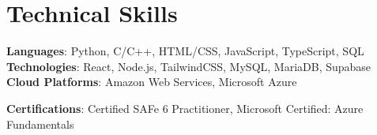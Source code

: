 \documentclass[letterpaper,11pt]{article}
\begin{document}
\section{Technical Skills}
 \begin{itemize}[leftmargin=0.15in, label={}]
    \small{\item{
     \textbf{Languages}{: Python, C/C++, HTML/CSS, JavaScript, TypeScript, SQL} \\
    \textbf{Technologies}{: React, Node.js, TailwindCSS, MySQL, MariaDB, Supabase} \\
     \textbf{Cloud Platforms}{: Amazon Web Services, Microsoft Azure} \\
     \begin{comment} 
    \textbf{Offensive/Defensive Security Tools}{: Metasploit, Burp Suite, Nmap, Wireshark, Ghidra, GDB+GEF, Radare2} \\
    \end{comment}  
    \textbf{Certifications}{: Certified SAFe 6 Practitioner, Microsoft Certified: Azure Fundamentals} \\
    }}
 \end{itemize}
 \vspace{-16pt}

%
\end{document}
